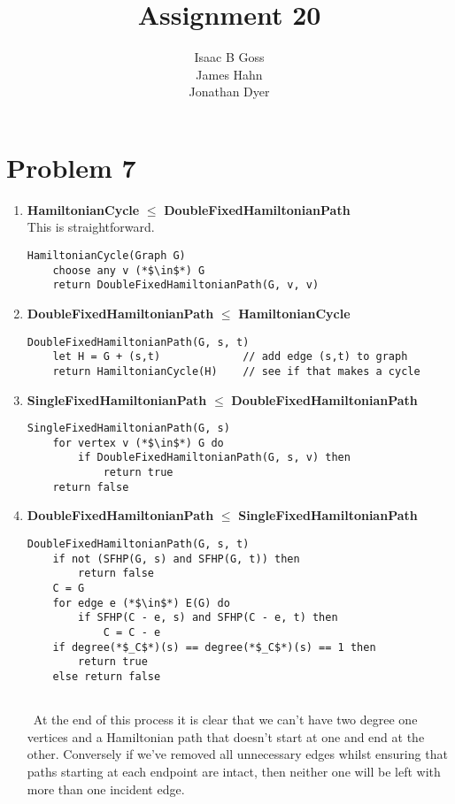 \documentclass{article}
\author{Isaac B Goss\\ James Hahn\\ Jonathan Dyer}
\title{Assignment 20}
\providecommand{\prob}[1]{\section*{Problem #1}}
\providecommand{\reducible}[2]{
  \textbf{#1} $\leq$ \textbf{#2}
}
\begin{document}
\maketitle
\prob{7}
\begin{enumerate}
  \item \reducible{HamiltonianCycle}{DoubleFixedHamiltonianPath} \\
        This is straightforward.
  \begin{lstlisting}
HamiltonianCycle(Graph G)
    choose any v (*$\in$*) G
    return DoubleFixedHamiltonianPath(G, v, v)
  \end{lstlisting}

  \item \reducible{DoubleFixedHamiltonianPath}{HamiltonianCycle}
  \begin{lstlisting}
DoubleFixedHamiltonianPath(G, s, t)
    let H = G + (s,t)             // add edge (s,t) to graph
    return HamiltonianCycle(H)    // see if that makes a cycle
  \end{lstlisting}

  \item \reducible{SingleFixedHamiltonianPath}{DoubleFixedHamiltonianPath}
  \begin{lstlisting}
SingleFixedHamiltonianPath(G, s)
    for vertex v (*$\in$*) G do
        if DoubleFixedHamiltonianPath(G, s, v) then
            return true
    return false
  \end{lstlisting}

  \item \reducible{DoubleFixedHamiltonianPath}{SingleFixedHamiltonianPath}
  \begin{lstlisting}
DoubleFixedHamiltonianPath(G, s, t)
    if not (SFHP(G, s) and SFHP(G, t)) then
        return false
    C = G
    for edge e (*$\in$*) E(G) do
        if SFHP(C - e, s) and SFHP(C - e, t) then
            C = C - e
    if degree(*$_C$*)(s) == degree(*$_C$*)(s) == 1 then
        return true
    else return false
  \end{lstlisting}
  At the end of this process it is clear that we can't have two degree one vertices and
  a Hamiltonian path that doesn't start at one and end at the other. Conversely if we've
  removed all unnecessary edges whilst ensuring that paths starting at each endpoint are
  intact, then neither one will be left with more than one incident edge. 
\end{enumerate}
\end{document}
